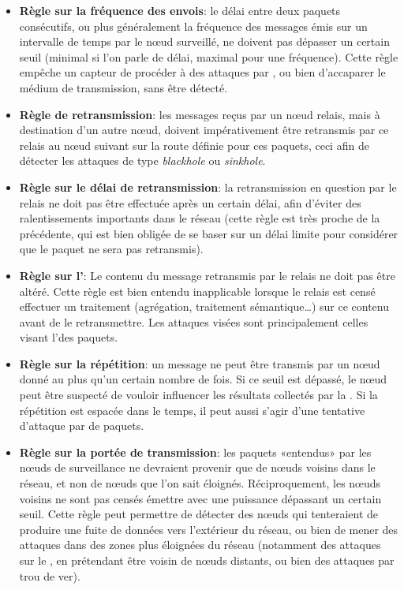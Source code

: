 \begin{itemize}
    \item \textbf{Règle sur la fréquence des envois}: le délai entre deux paquets consécutifs, ou plus généralement la fréquence des messages émis sur un intervalle de temps par le nœud surveillé, ne doivent pas dépasser un certain seuil (minimal si l'on parle de délai, maximal pour une fréquence). Cette règle empêche un capteur de procéder à des attaques par \deluge, ou bien d'accaparer le médium de transmission, sans être détecté.
    \item \textbf{Règle de retransmission}: les messages reçus par un nœud relais, mais à destination d'un autre nœud, doivent impérativement être retransmis par ce relais au nœud suivant sur la route définie pour ces paquets, ceci afin de détecter les attaques de type \textit{blackhole} ou \textit{sinkhole}.
    \item \textbf{Règle sur le délai de retransmission}: la retransmission en question par le relais ne doit pas être effectuée après un certain délai, afin d'éviter des ralentissements importants dans le réseau (cette règle est très proche de la précédente, qui est bien obligée de se baser sur un délai limite pour considérer que le paquet ne sera pas retransmis).
    \item \textbf{Règle sur l'\integrite}: Le contenu du message retransmis par le relais ne doit pas être altéré. Cette règle est bien entendu inapplicable lorsque le relais est censé effectuer un traitement (agrégation, traitement sémantique\dots) sur ce contenu avant de le retransmettre. Les attaques visées sont principalement celles visant l'\integrite des paquets.
    \item \textbf{Règle sur la répétition}: un message ne peut être transmis par un nœud donné au plus qu'un certain nombre de fois. Si ce seuil est dépassé, le nœud peut être suspecté de vouloir influencer les résultats collectés par la \sdb. Si la répétition est espacée dans le temps, il peut aussi s'agir d'une tentative d'attaque par  de paquets.
    \item \textbf{Règle sur la portée de transmission}: les paquets «entendus» par les nœuds de surveillance ne devraient provenir que de nœuds voisins dans le réseau, et non de nœuds que l'on sait éloignés. Réciproquement, les nœuds voisins ne sont pas censés émettre avec une puissance dépassant un certain seuil. Cette règle peut permettre de détecter des nœuds qui tenteraient de produire une fuite de données vers l'extérieur du réseau, ou bien de mener des attaques dans des zones plus éloignées du réseau (notamment des attaques sur le , en prétendant être voisin de nœuds distants, ou bien des attaques par trou de ver).

\end{itemize}
